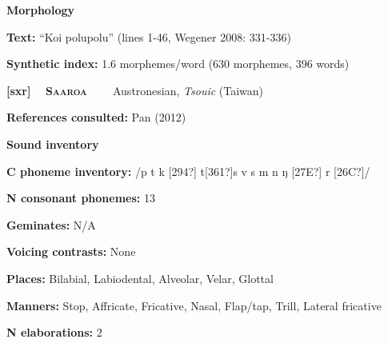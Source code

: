\begin{styleBody}
\textbf{Morphology}
\end{styleBody}

\begin{styleBody}
\textbf{Text:} “Koi polupolu” (lines 1-46, Wegener 2008: 331-336)
\end{styleBody}

\begin{styleBody}
\textbf{Synthetic index: }1.6 morphemes/word (630 morphemes, 396 words)
\end{styleBody}

\clearpage\begin{styleBody}
\textbf{[sxr] }\ \ \textbf{\textsc{Saaroa\ \ }}\textbf{\ \ }Austronesian, \textit{Tsouic} (Taiwan)
\end{styleBody}

\begin{styleBody}
\textbf{References consulted: }Pan (2012)
\end{styleBody}

\begin{styleBody}
\textbf{Sound inventory}
\end{styleBody}

\begin{styleBody}
\textbf{C phoneme inventory:} /p t k [294?] t[361?]s v s m n ŋ [27E?] r [26C?]/
\end{styleBody}

\begin{styleBody}
\textbf{N consonant phonemes:} 13
\end{styleBody}

\begin{styleBody}
\textbf{Geminates:} N/A
\end{styleBody}

\begin{styleBody}
\textbf{Voicing contrasts: }None
\end{styleBody}

\begin{styleBody}
\textbf{Places: }Bilabial, Labiodental, Alveolar, Velar, Glottal
\end{styleBody}

\begin{styleBody}
\textbf{Manners:} Stop, Affricate, Fricative, Nasal, Flap/tap, Trill, Lateral fricative
\end{styleBody}

\begin{styleBody}
\textbf{N elaborations:} 2
\end{styleBody}

